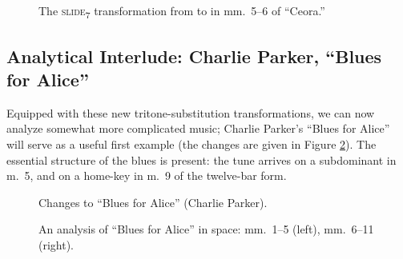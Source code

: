 \begin{figure}[tbp]
  \caption[The \protect\slideS transformation from \protect\h{Dbmaj7} to
  \protect\h{Dm7} in mm.~5--6 of ``Ceora.'']{The
    \textsc{slide}\textsubscript{7} transformation from \protect{}
    to \protect{} in mm.~5--6 of ``Ceora.''}
  \label{tft:slide7-ceora}
\end{figure}




\subsection{Analytical Interlude: Charlie Parker, “Blues for Alice”}
\label{sec:blues-for-alice}
\FloatBarrier

Equipped with these new tritone-substitution transformations, we can now
analyze somewhat more complicated music; Charlie Parker’s “Blues for Alice”
will serve as a useful first example (the changes are given in Figure
\ref{tft:blues-alice-changes}). The essential structure of the blues is
present: the tune arrives on a subdominant in m.~5, and on a home-key \tf in
m.~9 of the twelve-bar form.

\begin{figure}[tbp]
  \caption{Changes to ``Blues for Alice'' (Charlie Parker).}
  \label{tft:blues-alice-changes}
\end{figure}

\begin{figure}[tbp]
  \caption[An analysis of ``Blues for Alice'' in \tf space.]{An analysis of
    ``Blues for Alice'' in \tf space: mm.~1--5 (left), mm.~6--11 (right).}
  \label{tft:blues-alice-space}
\end{figure}


